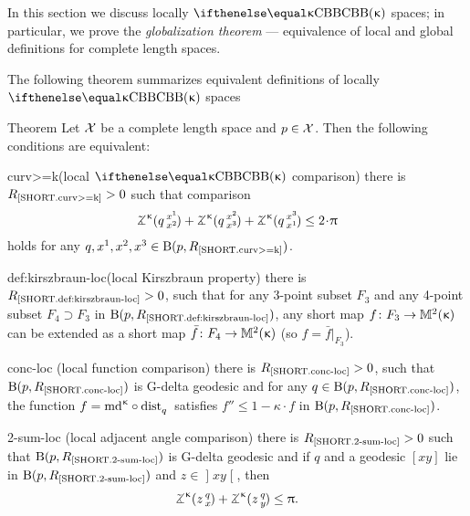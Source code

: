 In this section we discuss locally $\Alex{\kappa}$ spaces; 
in particular, we prove the {}\emph{globalization theorem} --- equivalence of local and global definitions for complete length spaces.

The following theorem summarizes equivalent definitions of locally $\Alex{\kappa}$ spaces

\begin{thm}{Theorem}\label{thm:=def-loc}
Let $\mathcal{X}$ be a complete length space and $p\in \spc{X}$.
Then the following conditions are equivalent:
\begin{subthmN}
{curv>=k}(local $\Alex\kappa$ comparison) there is $R_{\hbox{\rm\scriptsize\ref{SHORT.curv>=k}}}>0$ such that comparison 
\[\angk\kappa q{x^1}{x^2}
+\angk\kappa q{x^2}{x^3}
+\angk\kappa q{x^3}{x^1}
\le 2\cdot\pi\]
holds for any $q,x^1,x^2,x^3\in \oBall(p,R_{\hbox{\rm\scriptsize\ref{SHORT.curv>=k}}})$.
\end{subthmN}

\begin{subthmN}{def:kirszbraun-loc}(local Kirszbraun property) 
there is $R_{\hbox{\rm\scriptsize\ref{SHORT.def:kirszbraun-loc}}}>0$, 
such that for any 3-point subset $F_3$ and any 4-point subset $F_4\supset F_3$ in $\mathrm{B}{}(p,R_{\hbox{\rm\scriptsize\ref{SHORT.def:kirszbraun-loc}}})$, any short map $f\:F_3\to\Lob2\kappa$ can be extended as a short map $\bar f\:F_4\to\Lob2\kappa$ (so $f=\bar f|_{F_3}$).
\end{subthmN}

\begin{subthmN}{conc-loc} (local function comparison) there is 
$R_{\hbox{\rm\scriptsize\ref{SHORT.conc-loc}}}>0$, such that 
$\mathrm{B}{}(p,R_{\hbox{\rm\scriptsize\ref{SHORT.conc-loc}}})$ 
is G-delta geodesic and for any 
$q\in \oBall(p,R_{\hbox{\rm\scriptsize\ref{SHORT.conc-loc}}})$, 
the function $f=\md\kappa\circ\distfun{q}{}{}$ satisfies 
$f''\le 1-\kappa\cdot  f$ in
$\mathrm{B}{}(p,R_{\hbox{\rm\scriptsize\ref{SHORT.conc-loc}}})$.
\end{subthmN}

\begin{subthmN}{2-sum-loc} (local adjacent angle comparison) there is
$R_{\hbox{\rm\scriptsize\ref{SHORT.2-sum-loc}}}>0$ 
such that $\mathrm{B}{}(p,R_{\hbox{\rm\scriptsize\ref{SHORT.2-sum-loc}}})$ 
is G-delta geodesic and if $q$ and a geodesic $[x y]$ lie in
$\mathrm{B}{}(p,R_{\hbox{\rm\scriptsize\ref{SHORT.2-sum-loc}}})$ 
and $z\in \mathopen{]}x y\mathclose{[}$, then
\[\angk\kappa z q x
+\angk\kappa z q y
\le \pi.\]
\end{subthmN}


\end{thm}
